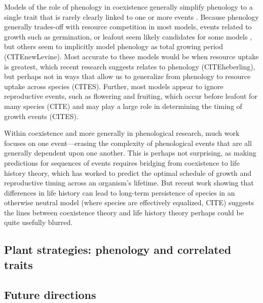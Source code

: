 \documentclass[11pt]{article}
\begin{document}
Models of the role of phenology in coexistence generally simplify phenology to a single trait that is rarely clearly linked to one or more events \citep[even when studied with empirical data][]{godoy2014} . Because phenology generally trades-off with resource competition in most models, events related to growth such as germination, or leafout seem likely candidates for some models \citep[e.g.,][]{godoy2014,memegan2021}, but others seem to implicitly model phenology as total growing period (CITEnewLevine). Most accurate to these models would be when resource uptake is greatest, which recent research suggests relates to phenology (CITEheberling), but perhaps not in ways that allow us to generalize from phenology to resource uptake across species (CITES). Further, most models appear to ignore reproductive events, such as flowering and fruiting, which occur before leafout for many species (CITE) and may play a large role in determining the timing of growth events (CITES). 

Within coexistence and more generally in phenological research, much work focuses on one event---erasing the complexity of phenological events that are all generally dependent upon one another. This is perhaps not surprising, as making predictions for sequences of events requires bridging from coexistence to life history theory, which has worked to predict the optimal schedule of growth and reproductive timing across an organism's lifetime. But recent work showing that differences in life history can lead to long-term persistence of species in an otherwise neutral model (where species are effectively equalized, CITE) suggests the lines between coexistence theory and life history theory perhaps could be quite usefully blurred. 


\subsection*{Plant strategies: phenology and correlated traits}



\subsection*{Future directions}

\end{document}
